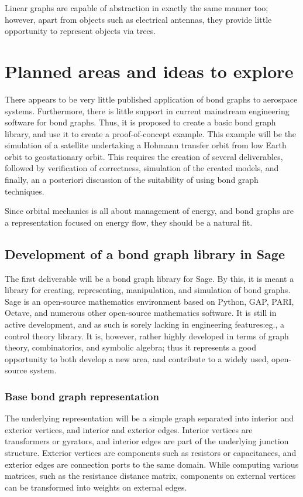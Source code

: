 \documentclass[utf8,a4paper,12pt]{report}
\begin{document}
Linear graphs are capable of abstraction in exactly the same manner too; however, apart from objects such as electrical antennas, they provide little opportunity to represent objects via trees.
\chapter{Planned areas and ideas to explore}
There appears to be very little published application of bond graphs to aerospace systems. Furthermore, there is little support in current mainstream engineering software for bond graphs. Thus, it is proposed to create a basic bond graph library, and use it to create a proof-of-concept example. This example will be the simulation of a satellite undertaking a Hohmann transfer orbit from low Earth orbit to geostationary orbit. This requires the creation of several deliverables, followed by verification of correctness, simulation of the created models, and finally, an a posteriori discussion of the suitability of using bond graph techniques.

Since orbital mechanics is all about management of energy, and bond graphs are a representation focused on energy flow, they should be a natural fit.
\section{Development of a bond graph library in Sage}
The first deliverable will be a bond graph library for Sage. By this, it is meant a library for creating, representing, manipulation, and simulation of bond graphs.
Sage is an open-source mathematics environment based on Python, GAP, PARI, Octave, and numerous other open-source mathematics software. It is still in active development, and as such is sorely lacking in engineering features:eg., a control theory library. It is, however, rather highly developed in terms of graph theory, combinatorics, and symbolic algebra; thus it represents a good opportunity to both develop a new area, and contribute to a widely used, open-source system.
\subsection{Base bond graph representation}
The underlying representation will be a simple graph separated into interior and exterior vertices, and interior and exterior edges. Interior vertices are transformers or gyrators, and interior edges are part of the underlying junction structure. Exterior vertices are components such as resistors or capacitances, and exterior edges are connection ports to the same domain. While computing various matrices, such as the resistance distance matrix, components on external vertices can be transformed into weights on external edges.
\end{document}
